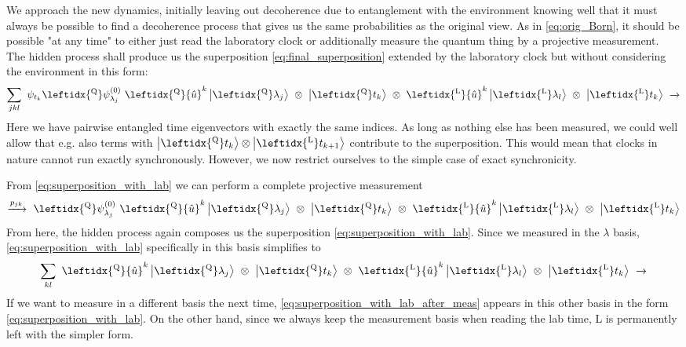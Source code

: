 \documentclass[12pt]{article}
\begin{document}
We approach the new dynamics, initially leaving out decoherence due to entanglement with the environment knowing well that it must always be possible to find a decoherence process that gives us the same probabilities as the original view. As in \eqref{eq:orig_Born}, it should be possible "at any time" to either just read the laboratory clock or additionally measure the quantum thing by a projective measurement. The hidden process shall produce us the superposition \eqref{eq:final_superposition} extended by the laboratory clock but without considering the environment in this form:
\begin{equation}
\label{eq:superposition_with_lab}
\sum_{jkl}\ \psi_{t_k} \leftidx{^\mathrm{Q}}\psi_{\lambda_j}^{(0)}\ 
\leftidx{^\mathrm{Q}}{\hat{u}}^k 
\ket{\leftidx{^\mathrm{Q}}\lambda_j} 
\ \otimes\ \ket{\leftidx{^\mathrm{Q}}t_k}
\ \otimes\ \leftidx{^\mathrm{L}}{\hat{u}}^k \ket{ \leftidx{^\mathrm{L}}\lambda_l} 
\ \otimes\ \ket{\leftidx{^\mathrm{L}}t_k}
\ \xrightarrow{}
\end{equation}
Here we have pairwise entangled time eigenvectors with exactly the same indices. As long as nothing else has been measured, we could well allow that e.g. also terms with $\ket{\leftidx{^\mathrm{Q}}t_k} \otimes \ket{\leftidx{^\mathrm{L}}t_{k+1}}$ contribute to the superposition. This would mean that clocks in nature cannot run exactly synchronously. However, we now restrict ourselves to the simple case of exact synchronicity.

From \eqref{eq:superposition_with_lab} we can perform a complete projective measurement
\begin{equation}
\xrightarrow{p_{jk}}\ \leftidx{^\mathrm{Q}}\psi_{\lambda_j}^{(0)}\ 
\leftidx{^\mathrm{Q}}{\hat{u}}^k
\ket{\leftidx{^\mathrm{Q}}\lambda_j} 
\ \otimes\ \ket{\leftidx{^\mathrm{Q}}t_k}
\ \otimes\ \leftidx{^\mathrm{L}}{\hat{u}}^k \ket{ \leftidx{^\mathrm{L}}\lambda_l} 
\ \otimes\ \ket{\leftidx{^\mathrm{L}}t_k}
\end{equation}
From here, the hidden process again composes us the superposition \eqref{eq:superposition_with_lab}. Since we measured in the $\lambda$ basis, \eqref{eq:superposition_with_lab} specifically in this basis simplifies to 
\begin{equation}
\label{eq:superposition_with_lab_after_meas}
\sum_{kl}\ \leftidx{^\mathrm{Q}}{\hat{u}}^k
\ket{\leftidx{^\mathrm{Q}}\lambda_j} 
\ \otimes\ \ket{\leftidx{^\mathrm{Q}}t_k}
\ \otimes\ \leftidx{^\mathrm{L}}{\hat{u}}^k \ket{ \leftidx{^\mathrm{L}}\lambda_l} 
\ \otimes\ \ket{\leftidx{^\mathrm{L}}t_k}
\ \xrightarrow{}
\end{equation}
If we want to measure in a different basis the next time, \eqref{eq:superposition_with_lab_after_meas} appears in this other basis in the form \eqref{eq:superposition_with_lab}. On the other hand, since we always keep the measurement basis when reading the lab time, L is permanently left with the simpler form.
\end{document}
